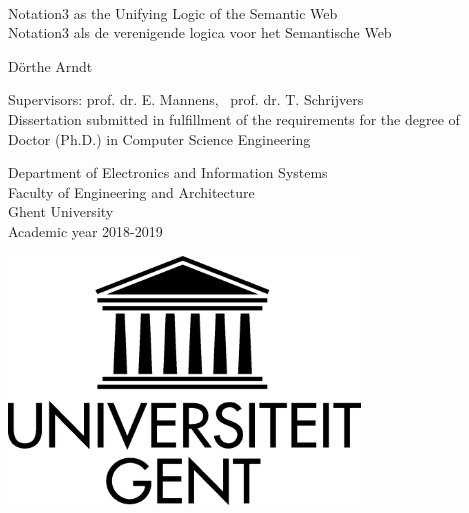 
{\large \ \vspace{0.25\textheight} \\

\hspace{-\parindent}Notation3 as the Unifying Logic of the Semantic Web\\

\hspace{-\parindent}Notation3 als de verenigende logica voor het Semantische Web


\vspace{0.5cm}
\hspace{-\parindent}D\"orthe Arndt

}

\vspace*{\fill}
\hspace{-\parindent}Supervisors: prof. dr. E. Mannens,~ prof. dr. T. Schrijvers\\
\hspace{-\parindent}Dissertation submitted in fulfillment of the requirements for the degree of\\
\hspace{-\parindent}Doctor (Ph.D.) in Computer Science Engineering\\


\vspace{0.5cm}

\hspace{-\parindent}\begin{minipage}{0.7\textwidth}
  \hspace{-\parindent}Department of Electronics and Information Systems\\
  \hspace{-\parindent}Faculty of Engineering and Architecture\\
  \hspace{-\parindent}Ghent University\\
  \hspace{-\parindent}Academic year 2018-2019
\end{minipage}
\begin{minipage}{0.3\textwidth}
  \begin{flushright}
    \includegraphics[width=0.7\textwidth]{./figures/logo-ugent}
  \end{flushright}
\end{minipage}

